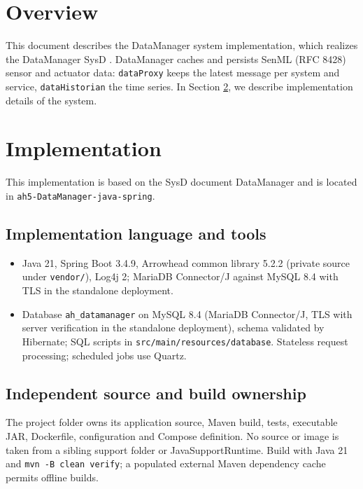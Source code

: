 \documentclass[a4paper]{arrowhead}
\begin{document}
\section{Overview}
\label{sec:overview}

This document describes the DataManager system implementation, which realizes the DataManager SysD \cite{dm-sysd}. DataManager caches and persists SenML (RFC 8428) sensor and actuator data: \texttt{dataProxy} keeps the latest message per system and service, \texttt{dataHistorian} the time series.
In Section \ref{Implementation}, we describe implementation details of the system.

\newpage

\section{Implementation}
\label{Implementation}

This implementation is based on the SysD document DataManager \cite{dm-sysd} and is located in \texttt{ah5-DataManager-java-spring}.

\subsection{Implementation language and tools}
\begin{itemize}
\item Java 21, Spring Boot 3.4.9, Arrowhead common library 5.2.2 (private source under \texttt{vendor/}), Log4j 2; MariaDB Connector/J against MySQL 8.4 with TLS in the standalone deployment.
\item Database \texttt{ah\_\allowbreak{}datamanager} on MySQL 8.4 (MariaDB Connector/J, TLS with server verification in the standalone deployment), schema validated by Hibernate; SQL scripts in \texttt{src/\allowbreak{}main/\allowbreak{}resources/\allowbreak{}database}. Stateless request processing; scheduled jobs use Quartz.
\end{itemize}

\subsection{Independent source and build ownership}
The project folder owns its application source, Maven build, tests, executable JAR, Dockerfile, configuration and Compose definition. No source or image is taken from a sibling support folder or JavaSupportRuntime. Build with Java 21 and \texttt{mvn -B clean verify}; a populated external Maven dependency cache permits offline builds.
\end{document}

